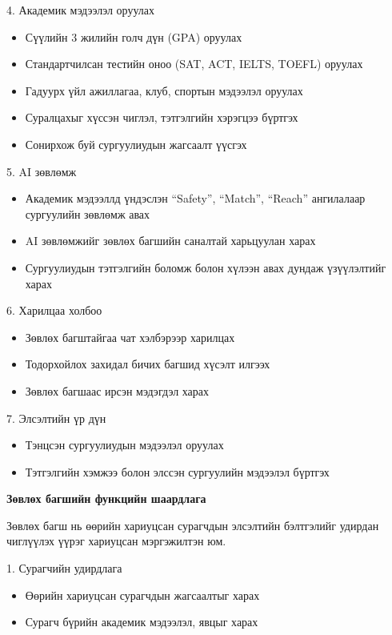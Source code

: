 4. Академик мэдээлэл оруулах
\begin{itemize}
    \item Сүүлийн 3 жилийн голч дүн (GPA) оруулах
    \item Стандартчилсан тестийн оноо (SAT, ACT, IELTS, TOEFL)
    оруулах
    \item Гадуурх үйл ажиллагаа, клуб, спортын мэдээлэл оруулах
    \item Суралцахыг хүссэн чиглэл, тэтгэлгийн хэрэгцээ бүртгэх
    \item Сонирхож буй сургуулиудын жагсаалт үүсгэх
\end{itemize}

5. AI зөвлөмж
\begin{itemize}
    \item Академик мэдээллд үндэслэн ``Safety'', ``Match'',
    ``Reach'' ангилалаар сургуулийн зөвлөмж авах
    \item AI зөвлөмжийг зөвлөх багшийн саналтай харьцуулан харах
    \item Сургуулиудын тэтгэлгийн боломж болон хүлээн авах дундаж
    үзүүлэлтийг харах
\end{itemize}

6. Харилцаа холбоо
\begin{itemize}
    \item Зөвлөх багштайгаа чат хэлбэрээр харилцах
    \item Тодорхойлох захидал бичих багшид хүсэлт илгээх
    \item Зөвлөх багшаас ирсэн мэдэгдэл харах
\end{itemize}

7. Элсэлтийн үр дүн
\begin{itemize}
    \item Тэнцсэн сургуулиудын мэдээлэл оруулах
    \item Тэтгэлгийн хэмжээ болон элссэн сургуулийн мэдээлэл
    бүртгэх
\end{itemize}

\textbf{Зөвлөх багшийн функцийн шаардлага}

Зөвлөх багш нь өөрийн хариуцсан сурагчдын элсэлтийн бэлтгэлийг
удирдан чиглүүлэх үүрэг хариуцсан мэргэжилтэн юм.

1. Сурагчийн удирдлага
\begin{itemize}
    \item Өөрийн хариуцсан сурагчдын жагсаалтыг харах
    \item Сурагч бүрийн академик мэдээлэл, явцыг харах
\end{itemize}

